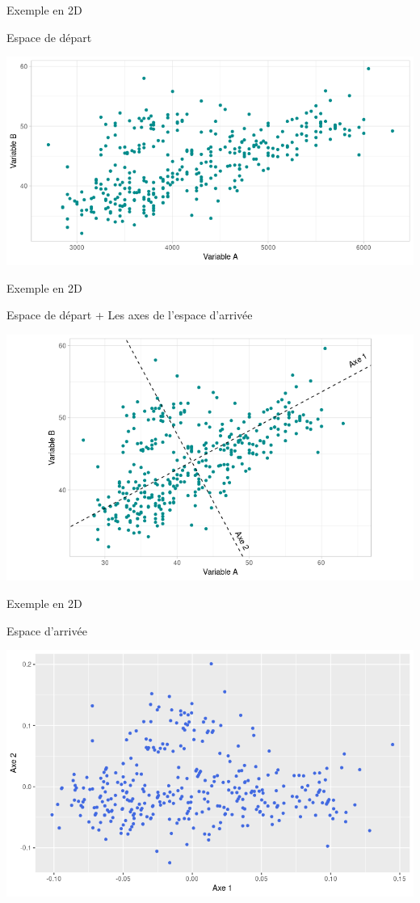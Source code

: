\documentclass{beamer}
\begin{document}
\begin{frame}{Exemple en 2D}

Espace de départ  

\centering
\includegraphics[width=\textwidth,keepaspectratio]{img/exemple_2D.png}

\end{frame}


\begin{frame}{Exemple en 2D}

Espace de départ + Les axes de l'espace d'arrivée

\centering
\includegraphics[width=\textwidth,keepaspectratio]{img/exemple_2D_axes.png}

\end{frame}


\begin{frame}{Exemple en 2D}

Espace d'arrivée 

\centering
\includegraphics[width=\textwidth,keepaspectratio]{img/exemple_2D_arrivee.png}

\end{frame}
\end{document}
